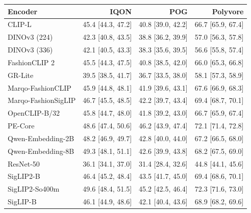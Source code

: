 \begin{table}[htbp]
\begin{tabular}{@{}lrrr@{}}
Encoder & IQON & POG & Polyvore\\\midrule
CLIP-L & 45.4 [44.3, 47.2] & 40.8 [39.0, 42.2] & 66.7 [65.9, 67.4]\\
DINOv3 (224) & 42.3 [40.8, 43.5] & 38.8 [36.2, 39.9] & 57.0 [56.3, 57.8]\\
DINOv3 (336) & 42.1 [40.5, 43.3] & 38.3 [35.6, 39.5] & 56.6 [55.8, 57.4]\\
FashionCLIP 2 & 45.5 [44.3, 47.5] & 40.8 [38.5, 42.0] & 66.0 [65.3, 66.8]\\
GR-Lite & 39.5 [38.5, 41.7] & 36.7 [33.5, 38.0] & 58.1 [57.3, 58.9]\\
Marqo-FashionCLIP & 45.9 [44.8, 48.1] & 41.9 [39.6, 43.1] & 67.6 [66.9, 68.3]\\
Marqo-FashionSigLIP & 46.7 [45.5, 48.5] & 42.2 [39.7, 43.4] & 69.4 [68.7, 70.1]\\
OpenCLIP-B/32 & 45.8 [44.7, 48.0] & 41.8 [39.2, 43.0] & 66.7 [65.9, 67.4]\\
PE-Core & 48.6 [47.4, 50.6] & 46.2 [43.9, 47.4] & 72.1 [71.4, 72.8]\\
Qwen-Embedding-2B & 48.2 [46.9, 49.7] & 42.8 [40.0, 44.0] & 67.2 [66.5, 68.0]\\
Qwen-Embedding-8B & 49.3 [48.1, 51.1] & 42.6 [39.9, 43.8] & 68.2 [67.5, 69.0]\\
ResNet-50 & 36.1 [34.1, 37.0] & 31.4 [28.4, 32.6] & 44.8 [44.1, 45.6]\\
SigLIP2-B & 46.4 [45.2, 48.4] & 43.5 [41.7, 45.0] & 69.4 [68.6, 70.1]\\
SigLIP2-So400m & 49.6 [48.4, 51.5] & 45.2 [42.5, 46.4] & 72.3 [71.6, 73.0]\\
SigLIP-B & 46.1 [44.9, 48.6] & 42.1 [40.4, 43.6] & 68.9 [68.2, 69.6]\\
\bottomrule\end{tabular}
\end{table}
